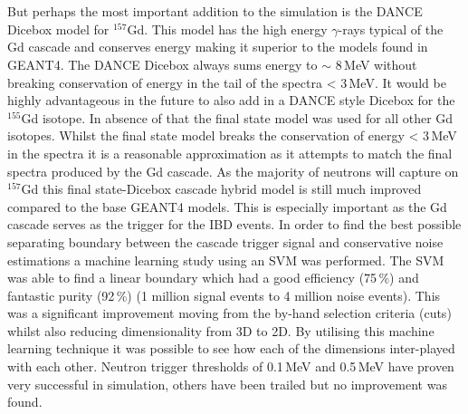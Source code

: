 \\\\But perhaps the most important addition to the simulation is the DANCE Dicebox model for $^{157}$Gd. This model has the high energy $\gamma$-rays typical of the Gd cascade and conserves energy making it superior to the models found in GEANT4. The DANCE Dicebox always sums energy to $\sim$ 8\,MeV without breaking conservation of energy in the tail of the spectra < 3\,MeV. It would be highly advantageous in the future to also add in a DANCE style Dicebox for the $^{155}$Gd isotope. In absence of that the final state model was used for all other Gd isotopes. Whilst the final state model breaks the conservation of energy < 3\,MeV in the spectra it is a reasonable approximation as it attempts to match the final spectra produced by the Gd cascade. As the majority of neutrons will capture on $^{157}$Gd \cite{Abdushukurov_2010} this final state-Dicebox cascade hybrid model is still much improved compared to the base GEANT4 models. This is especially important as the Gd cascade serves as the trigger for the IBD events. In order to find the best possible separating boundary between the cascade trigger signal and conservative noise estimations a machine learning study using an SVM was performed. The SVM was able to find a linear boundary which had a good efficiency (75\,\%) and fantastic purity (92\,\%) (1 million signal events to 4 million noise events). This was a significant improvement moving from the by-hand selection criteria (cuts) whilst also reducing dimensionality from 3D to 2D. By utilising this machine learning technique it was possible to see how each of the dimensions inter-played with each other. Neutron trigger thresholds of 0.1\,MeV and 0.5\,MeV have proven very successful in simulation, others have been trailed but no improvement was found. 
